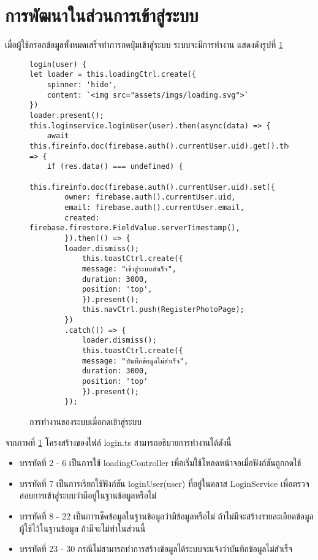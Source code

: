 \section{การพัฒนาในส่วนการเข้าสู่ระบบ}
เมื่อผู้ใช้กรอกข้อมูลทั้งหมดเสร็จทำการกดปุ่มเข้าสู่ระบบ ระบบจะมีการทำงาน แสดงดังรูปที่ \ref{Fig:4-login}

\begin{figure}[H]
{\lstset{language=Pascal}
\begin{lstlisting}
login(user) {
let loader = this.loadingCtrl.create({
	spinner: 'hide',
	content: `<img src="assets/imgs/loading.svg">`
})
loader.present();
this.loginservice.loginUser(user).then(async(data) => {
	await this.fireinfo.doc(firebase.auth().currentUser.uid).get().then((res) => {
	if (res.data() === undefined) {
		this.fireinfo.doc(firebase.auth().currentUser.uid).set({
		owner: firebase.auth().currentUser.uid,
		email: firebase.auth().currentUser.email,
		created: firebase.firestore.FieldValue.serverTimestamp(),
		}).then(() => {
		loader.dismiss();
			this.toastCtrl.create({
			message: "เข้าสู่ระบบสำเร็จ",
			duration: 3000,
			position: 'top',
			}).present();
			this.navCtrl.push(RegisterPhotoPage);
		})
		.catch(() => {
			loader.dismiss();
			this.toastCtrl.create({
			message: "บันทึกข้อมูลไม่สำเร็จ",
			duration: 3000,
			position: 'top'
			}).present();
		});
\end{lstlisting}}
\caption{การทำงานของระบบเมื่อกดเข้าสู่ระบบ}
\label{Fig:4-login}
\end{figure}
\newpage

จากภาพที่ \ref{Fig:4-login} โครงสร้างของไฟล์ login.ts สามารถอธิบายการทำงานได้ดังนี้
\begin{itemize}[label={--}]
\item บรรทัดที่ 2 - 6 เป็นการใช้ loadingController เพื่อเริ่มใช้โหลดหน้าจอเมื่อฟังก์ชันถูกกดใช้
\item บรรทัดที่ 7 เป็นการเรียกใช้ฟังก์ชัน loginUser(user) ที่อยู่ในคลาส LoginService เพื่อตรวจสอบการเข้าสู่ระบบว่ามีอยู่ในฐานข้อมูลหรือไม่
\item บรรทัดที่ 8 - 22 เป็นการเช็คข้อมูลในฐานข้อมูลว่ามีข้อมูลหรือไม่ ถ้าไม่มีจะสร้างรายละเอียดข้อมูลผู้ใช้ไว้ในฐานข้อมูล ถ้ามีจะไม่ทำในส่วนนี้
\item บรรทัดที่ 23 - 30 กรณีไม่สามารถทำการสร้างข้อมูลได้ระบบจะแจ้งว่าบันทึกข้อมูลไม่สำเร็จ 
\end{itemize}
\newpage



